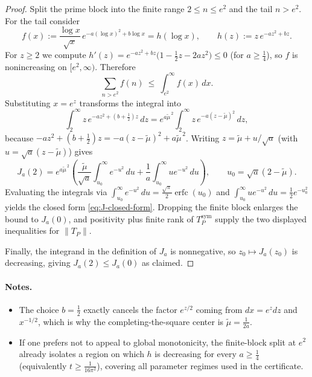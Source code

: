 \begin{proof}
Split the prime block into the finite range $2\le n\le e^2$ and the tail $n>e^2$. For the tail consider
\begin{equation}\label{eq:Prime_norm_leq_rho-formula-5}
  f(x) := \frac{\log x}{\sqrt{x}}\,e^{-a(\log x)^2 + b\log x}
  = h(\log x),\qquad h(z):= z\,e^{-a z^2 + b z}.
\end{equation}
For $z\ge 2$ we compute $h'(z)=e^{-a z^2 + b z}\bigl(1-\tfrac12 z-2a z^2\bigr)\le 0$ (for $a\ge \tfrac14$), so $f$ is nonincreasing on $[e^2,\infty)$. Therefore
\begin{equation}\label{eq:Prime_norm_leq_rho-formula-4}
  \sum_{n>e^2} f(n) \ \le\ \int_{e^2}^{\infty} f(x)\,dx.
\end{equation}
Substituting $x=e^{z}$ transforms the integral into
\begin{equation}\label{eq:Prime_norm_leq_rho-formula-3}
  \int_{2}^{\infty} z\,e^{-a z^2 + (b+\frac12)z}\,dz
  = e^{a\widetilde{\mu}^{\,2}} \int_{2}^{\infty} z\,e^{-a (z-\widetilde{\mu})^2}\,dz,
\end{equation}
because $-a z^2 + (b+\frac12)z = -a(z-\widetilde{\mu})^2 + a\widetilde{\mu}^{\,2}$. Writing $z = \widetilde{\mu} + u/\sqrt{a}$ (with $u = \sqrt{a}(z-\widetilde{\mu})$) gives
\begin{equation}\label{eq:Prime_norm_leq_rho-formula-2}
  J_a(2) = e^{a\widetilde{\mu}^{\,2}}\left(\frac{\widetilde{\mu}}{\sqrt{a}}\int_{u_0}^{\infty} e^{-u^2}\,du + \frac{1}{a}\int_{u_0}^{\infty} u e^{-u^2}\,du\right),
  \qquad u_0 = \sqrt{a}(2-\widetilde{\mu}).
\end{equation}
Evaluating the integrals via $\int_{u_0}^{\infty} e^{-u^2}\,du = \frac{\sqrt{\pi}}{2}\operatorname{erfc}(u_0)$ and $\int_{u_0}^{\infty} u e^{-u^2}\,du = \tfrac12 e^{-u_0^2}$ yields the closed form \eqref{eq:J-closed-form}. Dropping the finite block enlarges the bound to $J_a(0)$, and positivity plus finite rank of $T_P^{\mathrm{sym}}$ supply the two displayed inequalities for $\|T_P\|$.

Finally, the integrand in the definition of $J_a$ is nonnegative, so $z_0 \mapsto J_a(z_0)$ is decreasing, giving $J_a(2)\le J_a(0)$ as claimed.
\end{proof}

\paragraph{Notes.}
\begin{itemize}
  \item The choice $b=\tfrac12$ exactly cancels the factor $e^{z/2}$ coming from $dx=e^{z}dz$ and $x^{-1/2}$, which is why the completing-the-square center is $\widetilde{\mu}=\tfrac{1}{2a}$.
  \item If one prefers not to appeal to global monotonicity, the finite-block split at $e^{2}$ already isolates a region on which $h$ is decreasing for every $a\ge \tfrac14$ (equivalently $t\ge \tfrac{1}{16\pi^2}$), covering all parameter regimes used in the certificate.
\end{itemize}

